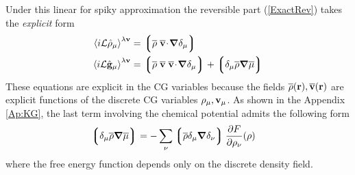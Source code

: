 \documentclass[b5paper,openright,11pt]{book}
\newcommand{\esc}{\!\cdot\!}
\newcommand{\llangle}{\left\langle}
\newcommand{\rrangle}{\right\rangle}
\newcommand{\llg}{\left\lgroup}
\newcommand{\rlg}{\right\rgroup}
\begin{document}
Under this  linear for spiky  approximation the reversible  part (\ref{ExactRev}) takes
the \textit{explicit} form
\begin{align}
  \llangle i{\cal L}  \hat{\rho}_{\mu}\rrangle^{\lambda{\bf v}}&= 
\llg \overline{\rho}\;\overline{\bf v}\esc\boldsymbol{\nabla}\delta_\mu\rlg
\nonumber\\
\llangle i{\cal L}  \hat{\bf g}_{\mu}\rrangle^{\lambda{\bf v}} &=
\llg\overline{\rho}\;\overline{\bf v}\;\overline{\bf v}\esc\boldsymbol{\nabla}\delta_{\mu}\rlg
+\llg\delta_\mu\overline{\rho}\boldsymbol{\nabla}\overline{\mu}\rlg
\label{RevDis}
\end{align}
These equations  are explicit in  the CG variables because  the fields
$\overline{\rho}({\bf  r}),\overline{\bf  v}({\bf  r})$  are  explicit
functions  of the  discrete CG  variables $\rho_\mu,{\bf  v}_\mu$.  As
shown  in  the  Appendix  \ref{Ap:KG}, the  last  term  involving  the
chemical potential admits the following form
\begin{align}
  \llg\delta_\mu\overline{\rho}\boldsymbol{\nabla}\overline{\mu}\rlg&=
-\sum_\nu\llg\overline{\rho}\delta_{\mu}\boldsymbol{\nabla}\delta_{\nu}\rlg
\frac{\partial  F}{\partial \rho_{\nu}}(\rho)
\end{align}
where the free energy function depends only on the discrete density field.
\end{document}
